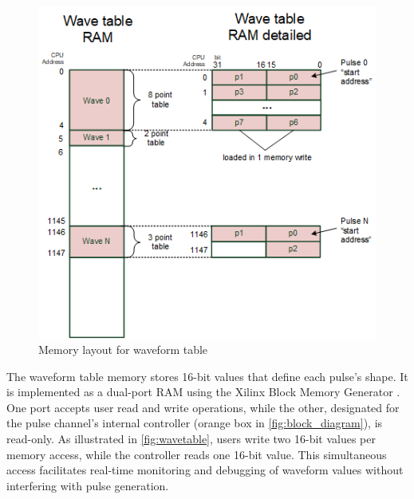 \begin{figure}[htbp]
    \setlength{\abovecaptionskip}{5pt}    %
    \setlength{\belowcaptionskip}{5pt}    %
    \centering
    \includegraphics[width=0.55\linewidth]{figures/3.3.png}
    \caption{Memory layout for waveform table}
    \label{fig:wavetable}
\end{figure}

The waveform table memory stores 16-bit values that define each pulse's shape. It is implemented as a dual-port RAM using the Xilinx Block Memory Generator \cite{blockmemgen}. One port accepts user read and write operations, while the other, designated for the pulse channel's internal controller (orange box in \autoref{fig:block_diagram}), is read-only. As illustrated in \autoref{fig:wavetable}, users write two 16-bit values per memory access, while the controller reads one 16-bit value. This simultaneous access facilitates real-time monitoring and debugging of waveform values without interfering with pulse generation.



